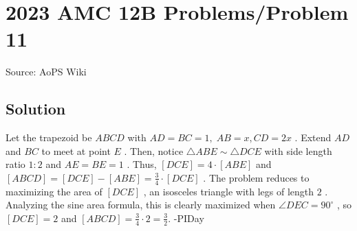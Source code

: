 \documentclass[12pt]{article}
\begin{document}
\section*{{2023 AMC 12B Problems/Problem 11}}
Source: AoPS Wiki

\subsection*{Solution}
Let the trapezoid be $ABCD$ with $AD = BC = 1, \; AB = x, CD = 2x$ . Extend $AD$ and $BC$ to meet at point $E$ . Then, notice $\triangle ABE \sim \triangle DCE$ with side length ratio $1:2$ and $AE = BE = 1$ . Thus, $[DCE] = 4 \cdot [ABE]$ and $[ABCD] = [DCE] - [ABE] = \frac{3}{4} \cdot [DCE]$ . The problem reduces to maximizing the area of $[DCE]$ , an isosceles triangle with legs of length $2$ . Analyzing the sine area formula, this is clearly maximized when $\angle DEC = 90^{\circ}$ , so $[DCE] = 2$ and $[ABCD] = \frac{3}{4} \cdot 2 = \boxed{\frac{3}{2}}.$ -PIDay
\end{document}
